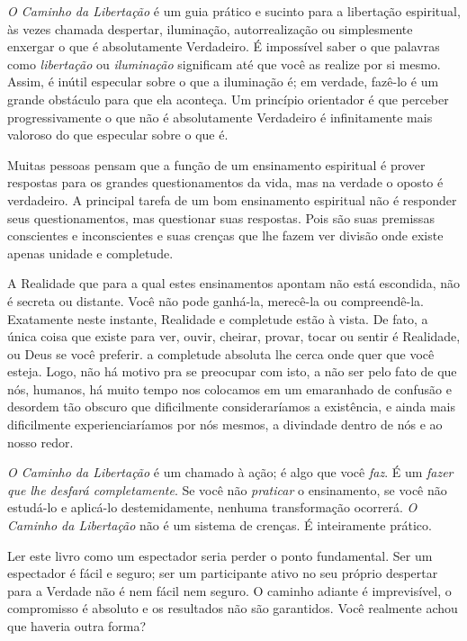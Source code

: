 \emph{O Caminho da Libertação} é um guia prático e sucinto para a libertação espiritual, às vezes chamada despertar, iluminação, autorrealização ou simplesmente enxergar o que é absolutamente Verdadeiro. É impossível saber o que palavras como \emph{libertação} ou \emph{iluminação} significam até que você as realize por si mesmo. Assim, é inútil especular sobre o que a iluminação é; em verdade, fazê-lo é um grande obstáculo para que ela aconteça. Um princípio orientador é que perceber progressivamente o que não é absolutamente Verdadeiro é infinitamente mais valoroso do que especular sobre o que é.

Muitas pessoas pensam que a função de um ensinamento espiritual é prover respostas para os grandes questionamentos da vida, mas na verdade o oposto é verdadeiro. A principal tarefa de um bom ensinamento espiritual não é responder seus questionamentos, mas questionar suas respostas. Pois são suas premissas conscientes e inconscientes e suas crenças que lhe fazem ver divisão onde existe apenas unidade e completude.

A Realidade que para a qual estes ensinamentos apontam não está escondida, não é secreta ou distante. Você não pode ganhá-la, merecê-la ou compreendê-la. Exatamente neste instante, Realidade e completude estão à vista. De fato, a única coisa que existe para ver, ouvir, cheirar, provar, tocar ou sentir é Realidade, ou Deus se você preferir. a completude absoluta lhe cerca onde quer que você esteja. Logo, não há motivo pra se preocupar com isto, a não ser pelo fato de que nós, humanos, há muito tempo nos colocamos em um emaranhado de confusão e desordem tão obscuro que dificilmente consideraríamos a existência, e ainda mais dificilmente experienciaríamos por nós mesmos, a divindade dentro de nós e ao nosso redor.

\emph{O Caminho da Libertação} é um chamado à ação; é algo que você \emph{faz}. É um \emph{fazer que lhe desfará completamente}. Se você não \emph{praticar} o ensinamento, se você não estudá-lo e aplicá-lo destemidamente, nenhuma transformação ocorrerá. \emph{O Caminho da Libertação} não é um sistema de crenças. É inteiramente prático.

Ler este livro como um espectador seria perder o ponto fundamental. Ser um espectador é fácil e seguro; ser um participante ativo no seu próprio despertar para a Verdade não é nem fácil nem seguro. O caminho adiante é imprevisível, o compromisso é absoluto e os resultados não são garantidos. Você realmente achou que haveria outra forma?

